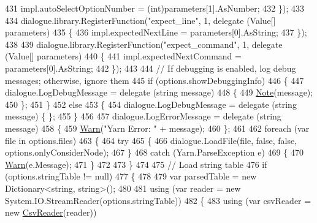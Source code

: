 \begin{DoxyCode}
431                 impl.autoSelectOptionNumber = (int)parameters[1].AsNumber;
432             \});
433 
434             dialogue.library.RegisterFunction(\textcolor{stringliteral}{"expect\_line"}, 1, delegate (Value[] parameters)
435             \{
436                 impl.expectedNextLine = parameters[0].AsString;
437             \});
438 
439             dialogue.library.RegisterFunction(\textcolor{stringliteral}{"expect\_command"}, 1, delegate (Value[] parameters)
440             \{
441                 impl.expectedNextCommand = parameters[0].AsString;
442             \});
443 
444             \textcolor{comment}{// If debugging is enabled, log debug messages; otherwise, ignore them}
445             \textcolor{keywordflow}{if} (options.showDebuggingInfo)
446             \{
447                 dialogue.LogDebugMessage = delegate (\textcolor{keywordtype}{string} message)
448                 \{
449                     \hyperlink{a00174_a939cc9e943c574b36c6af93e9c772702}{Note}(message);
450                 \};
451             \}
452             \textcolor{keywordflow}{else}
453             \{
454                 dialogue.LogDebugMessage = delegate (\textcolor{keywordtype}{string} message) \{ \};
455             \}
456 
457             dialogue.LogErrorMessage = delegate (\textcolor{keywordtype}{string} message)
458             \{
459                 \hyperlink{a00174_a979bb6f049b6c5294f745a19e24ddd9d}{Warn}(\textcolor{stringliteral}{"Yarn Error: "} + message);
460             \};
461 
462             \textcolor{keywordflow}{foreach} (var file \textcolor{keywordflow}{in} options.files)
463             \{
464                 \textcolor{keywordflow}{try}
465                 \{
466                     dialogue.LoadFile(file, \textcolor{keyword}{false}, \textcolor{keyword}{false}, options.onlyConsiderNode);
467                 \}
468                 \textcolor{keywordflow}{catch} (Yarn.ParseException e)
469                 \{
470                     \hyperlink{a00174_a979bb6f049b6c5294f745a19e24ddd9d}{Warn}(e.Message);
471                 \}
472 
473             \}
474 
475             \textcolor{comment}{// Load string table}
476             \textcolor{keywordflow}{if} (options.stringTable != null)
477             \{
478 
479                 var parsedTable = \textcolor{keyword}{new} Dictionary<string, string>();
480 
481                 \textcolor{keyword}{using} (var reader = \textcolor{keyword}{new} System.IO.StreamReader(options.stringTable))
482                 \{
483                     \textcolor{keyword}{using} (var csvReader = \textcolor{keyword}{new} \hyperlink{a00076}{CsvReader}(reader))

\end{DoxyCode}
